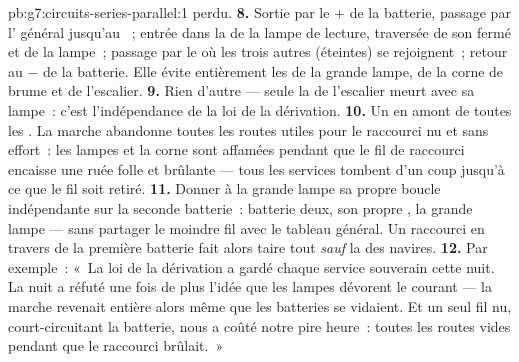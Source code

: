 \begin{solution}{pb:g7:circuits-series-parallel:1}
perdu.
\textbf{8.} Sortie par le $+$ de la batterie, passage par
l' général jusqu'au ~; entrée dans la  de la
lampe de lecture, traversée de son  fermé et de la
lampe~; passage par le  où les trois autres  (éteintes)
se rejoignent~; retour au $-$ de la batterie. Elle évite entièrement
les  de la grande lampe, de la corne de brume et de
l'escalier.
\textbf{9.} Rien d'autre --- seule la  de l'escalier meurt
avec sa lampe~: c'est l'indépendance de la loi de la dérivation.
\textbf{10.} Un  en amont de toutes les . La
marche abandonne toutes les routes utiles pour le raccourci nu et
sans effort~: les lampes et la corne sont affamées pendant que le fil
de raccourci encaisse une ruée folle et brûlante --- tous les
services tombent d'un coup jusqu'à ce que le fil soit retiré.
\textbf{11.} Donner à la grande lampe sa propre boucle indépendante
sur la seconde batterie~: batterie deux, son propre , la
grande lampe --- sans partager le moindre fil avec le tableau
général. Un raccourci en travers de la première batterie fait alors
taire tout \emph{sauf} la  des navires.
\textbf{12.} Par exemple~: «~La loi de la dérivation a gardé chaque
service souverain cette nuit. La nuit a réfuté une fois de plus
l'idée que les lampes dévorent le courant --- la marche revenait
entière alors même que les batteries se vidaient. Et un seul fil nu,
court-circuitant la batterie, nous a coûté notre pire heure~: toutes
les routes vides pendant que le raccourci brûlait.~»
\end{solution}

